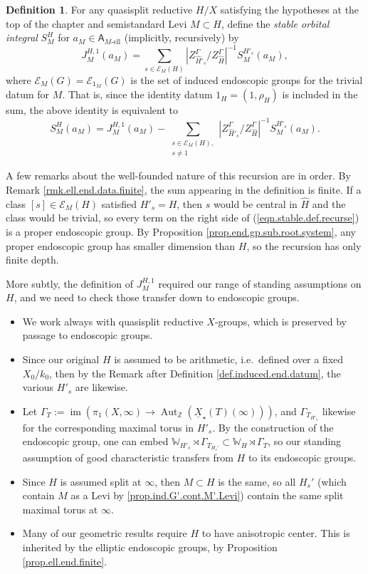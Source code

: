 \documentclass[openany]{amsbook}
\theoremstyle{definition}
\newtheorem{definition}[theorem]{Definition}
\theoremstyle{remark}
\numberwithin{equation}{section}
\newcommand{\Z}{\mathbb{Z}}
\newcommand{\W}{\mathbb{W}}
\newcommand{\cE}{\mathcal{E}}
\newcommand{\im}{\operatorname{im}}
\newcommand{\ul}[1]{\underline{#1}}
\renewcommand{\-}{\operatorname{-}}
\newcommand{\Aut}{\operatorname{Aut}}
\newcommand{\el}{\text{-ell}}
\newcommand{\bA}{\mathsf{A}}
\newcommand{\bAe}[1]{\bA_{#1\el}}
\begin{document}
\begin{definition}\label{def.stable.orb.integral.global}
    For any quasisplit reductive $H/X$ satisfying the hypotheses at the top of the chapter and semistandard Levi $M \subset H$, define the \emph{stable orbital integral} $S^H_M$ for $a_M \in \bAe{M}$ (implicitly, recursively) by
    $$
        J_M^{H,1}(a_M) = \sum_{s \in \cE_{M}(H)} \left| Z_{\widehat{H}'_s}^\Gamma / Z_{\widehat{H}}^\Gamma \right|^{-1} S^{H'_s}_M(a_M),
    $$
    where $\cE_M(G) = \cE_{1_M}(G)$ is the set of induced endoscopic groups for the trivial datum for $M$. That is, since the identity datum $1_H = (1, \rho_H)$ is included in the sum, the above identity is equivalent to
    \begin{equation}
        S^{H}_M(a_M) = J_M^{H,1}(a_M) - \sum_{\substack{s \in \cE_{M}(H),\\ s \neq 1}} \left| Z_{\widehat{H}'_s}^\Gamma / Z_{\widehat{H}}^\Gamma \right|^{-1} S^{H'_s}_M(a_M).\label{eqn.stable.def.recurse}
    \end{equation}
\end{definition}

A few remarks about the well-founded nature of this recursion are in order. By Remark \ref{rmk.ell.end.data.finite}, the sum appearing in the definition is finite. If a class $[s]\in \cE_M(H)$ satisfied $H'_s = H$, then $s$ would be central in $\widehat{H}$ and the class would be trivial, so every term on the right side of (\ref{eqn.stable.def.recurse}) is a proper endoscopic group. By Proposition \ref{prop.end.gp.sub.root.system}, any proper endoscopic group has smaller dimension than $H$, so the recursion has only finite depth.

More subtly, the definition of $J_M^{H,1}$ required our range of standing assumptions on $H$, and we need to check those transfer down to endoscopic groups.
\begin{itemize}
    \item We work always with quasisplit reductive $X$-groups, which is preserved by passage to endoscopic groups.
    \item Since our original $H$ is assumed to be arithmetic, i.e.\ defined over a fixed $X_0/k_0$, then by the Remark after Definition \ref{def.induced.end.datum}, the various $H'_s$ are likewise.
    \item Let $\Gamma_T := \im(\pi_1(X, \infty) \to \Aut_{\Z}(\ul{X}_\star(T)(\infty)))$, and $\Gamma_{T_{H'_s}}$ likewise for the corresponding maximal torus in $H'_s$. By the construction of the endoscopic group, one can embed $\W_{H'_s} \rtimes \Gamma_{T_{H_s'}} \subset \W_{H} \rtimes \Gamma_T$, so our standing assumption of good characteristic transfers from $H$ to its endoscopic groups.
    \item Since $H$ is assumed split at $\infty$, then $M \subset H$ is the same, so all $H_s'$ (which contain $M$ as a Levi by \ref{prop.ind.G'.cont.M'.Levi}) contain the same split maximal torus at $\infty$.
    \item Many of our geometric results require $H$ to have anisotropic center. This is inherited by the elliptic endoscopic groups, by Proposition \ref{prop.ell.end.finite}.
\end{itemize}
\end{document}
